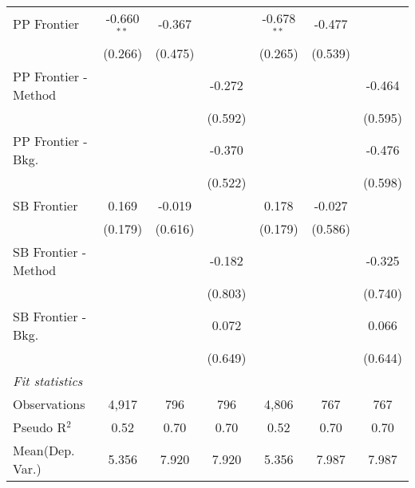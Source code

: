 \begin{tabular}{lcccccc}
   PP Frontier          & -0.660$^{**}$ & -0.367       &               & -0.678$^{**}$ & -0.477       &   \\   
                        & (0.266)       & (0.475)      &               & (0.265)       & (0.539)      &   \\   
   PP Frontier - Method &               &              & -0.272        &               &              & -0.464\\   
                        &               &              & (0.592)       &               &              & (0.595)\\   
   PP Frontier - Bkg.   &               &              & -0.370        &               &              & -0.476\\   
                        &               &              & (0.522)       &               &              & (0.598)\\   
   SB Frontier          & 0.169         & -0.019       &               & 0.178         & -0.027       &   \\   
                        & (0.179)       & (0.616)      &               & (0.179)       & (0.586)      &   \\   
   SB Frontier - Method &               &              & -0.182        &               &              & -0.325\\   
                        &               &              & (0.803)       &               &              & (0.740)\\   
   SB Frontier - Bkg.   &               &              & 0.072         &               &              & 0.066\\   
                        &               &              & (0.649)       &               &              & (0.644)\\   
   \midrule
   \emph{Fit statistics}\\
   Observations         & 4,917         & 796          & 796           & 4,806         & 767          & 767\\  
   Pseudo R$^2$         & 0.52          & 0.70         & 0.70          & 0.52          & 0.70         & 0.70\\  
Mean(Dep. Var.) & 5.356 & 7.920 & 7.920 & 5.356 & 7.987 & 7.987 \\
   

\end{tabular}
